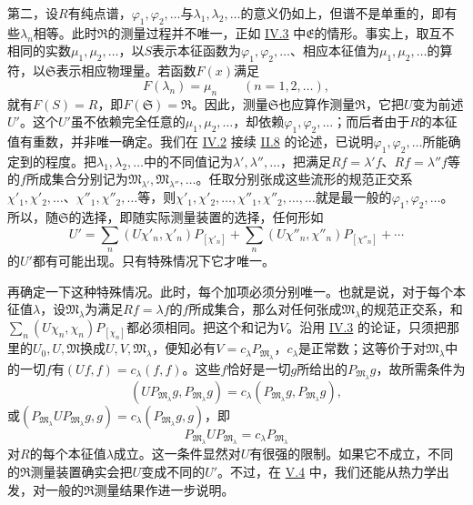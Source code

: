 \documentclass[fontsize=13pt,twoside,openany,headings=normal,parskip=false,bookmarkpackage=false,DIV=calc]{scrbook}
\begin{document}
第二，设$R$有纯点谱，$\varphi_1,\allowbreak \varphi_2,\allowbreak \ldots$与$\lambda_1,\allowbreak \lambda_2,\allowbreak \ldots$的意义仍如上，但谱不是单重的，即有些$\lambda_n$相等。此时$\mathfrak R$的测量过程并不唯一，正如 \hyperref[sec:IV.3]{IV.3} 中$\mathfrak E$的情形。事实上，取互不相同的实数$\mu_1,\allowbreak \mu_2,\allowbreak \ldots$，以$S$表示本征函数为$\varphi_1,\allowbreak \varphi_2,\allowbreak \ldots$、相应本征值为$\mu_1,\allowbreak \mu_2,\allowbreak \ldots$的算符，以$\mathfrak S$表示相应物理量。若函数$F(x)$满足
\[
F(\lambda_n)=\mu_n\qquad(n=1,2,\ldots),
\]
就有$F(S)=R$，即$F(\mathfrak S)=\mathfrak R$。因此，测量$\mathfrak S$也应算作测量$\mathfrak R$，它把$U$变为前述$U'$。\hypertarget{origpage-185}{}\label{origpage-185}这个$U'$虽不依赖完全任意的$\mu_1,\allowbreak \mu_2,\allowbreak \ldots$，却依赖$\varphi_1,\allowbreak \varphi_2,\allowbreak \ldots$；而后者由于$R$的本征值有重数，并非唯一确定。我们在 \hyperref[sec:IV.2]{IV.2} 接续 \hyperref[sec:II.8]{II.8} 的论述，已说明$\varphi_1,\allowbreak \varphi_2,\allowbreak \ldots$所能确定到的程度。把$\lambda_1,\allowbreak \lambda_2,\allowbreak \ldots$中的不同值记为$\lambda',\allowbreak \lambda'',\allowbreak \ldots$，把满足$Rf=\lambda'f$、$Rf=\lambda''f$等的$f$所成集合分别记为$\mathfrak M_{\lambda'},\allowbreak \mathfrak M_{\lambda''},\allowbreak \ldots$。任取分别张成这些流形的规范正交系$\chi'_1,\allowbreak \chi'_2,\allowbreak \ldots$、$\chi''_1,\allowbreak \chi''_2,\allowbreak \ldots$等，则$\chi'_1,\allowbreak \chi'_2,\allowbreak \ldots,\allowbreak \chi''_1,\allowbreak \chi''_2,\allowbreak \ldots,\allowbreak \ldots$就是最一般的$\varphi_1,\allowbreak \varphi_2,\allowbreak \ldots$。所以，随$\mathfrak S$的选择，即随实际测量装置的选择，任何形如
\[
U'=\sum_n(U\chi'_n,\chi'_n)P_{[\chi'_n]}
+\sum_n(U\chi''_n,\chi''_n)P_{[\chi''_n]}+\cdots
\]
的$U'$都有可能出现。只有特殊情况下它才唯一。

再确定一下这种特殊情况。此时，每个加项必须分别唯一。也就是说，对于每个本征值$\lambda$，设$\mathfrak M_\lambda$为满足$Rf=\lambda f$的$f$所成集合，那么对任何张成$\mathfrak M_\lambda$的规范正交系，和$\sum_n(U\chi_n,\allowbreak \chi_n)P_{[\chi_n]}$都必须相同。把这个和记为$V$。沿用 \hyperref[sec:IV.3]{IV.3} 的论证，只须把那里的$U_0,\allowbreak U,\allowbreak \mathfrak M$换成$U,\allowbreak V,\allowbreak \mathfrak M_\lambda$，便知必有$V=c_\lambda P_{\mathfrak M_\lambda}$，$c_\lambda$是正常数；这等价于对$\mathfrak M_\lambda$中的一切$f$有$(Uf,\allowbreak f)=c_\lambda(f,\allowbreak f)$。这些$f$恰好是一切$g$所给出的$P_{\mathfrak M_\lambda}g$，故所需条件为
\[
(UP_{\mathfrak M_\lambda}g,P_{\mathfrak M_\lambda}g)
=c_\lambda(P_{\mathfrak M_\lambda}g,P_{\mathfrak M_\lambda}g),
\]
或$(P_{\mathfrak M_\lambda}UP_{\mathfrak M_\lambda}g,\allowbreak g)=c_\lambda(P_{\mathfrak M_\lambda}g,\allowbreak g)$，即
\[
P_{\mathfrak M_\lambda}UP_{\mathfrak M_\lambda}=c_\lambda P_{\mathfrak M_\lambda}
\]
对$R$的每个本征值$\lambda$成立。这一条件显然对$U$有很强的限制。如果它不成立，不同的$\mathfrak R$测量装置确实会把$U$变成不同的$U'$。不过，在 \hyperref[sec:V.4]{V.4} 中，我们还能从热力学出发，对一般的$\mathfrak R$测量结果作进一步说明。
\end{document}
